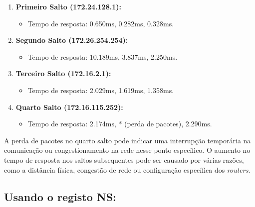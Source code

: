 \begin{enumerate}
    \item \textbf{Primeiro Salto (172.24.128.1):}
        \begin{itemize}
            \item Tempo de resposta: 0.650ms, 0.282ms, 0.328ms.
        \end{itemize}
    
    \item \textbf{Segundo Salto (172.26.254.254):}
        \begin{itemize}
            \item Tempo de resposta: 10.189ms, 3.837ms, 2.250ms.
        \end{itemize}
    
    \item \textbf{Terceiro Salto (172.16.2.1):}
        \begin{itemize}
            \item Tempo de resposta: 2.029ms, 1.619ms, 1.358ms.
        \end{itemize}
    
    \item \textbf{Quarto Salto (172.16.115.252):}
        \begin{itemize}
            \item Tempo de resposta: 2.174ms, * (perda de pacotes), 2.290ms.
        \end{itemize}
  \end{enumerate}
  
  A perda de pacotes no quarto salto pode indicar uma interrupção 
  temporária na comunicação ou congestionamento na rede nesse ponto 
  específico. O aumento no tempo de resposta nos saltos subsequentes 
  pode ser causado por várias razões, como a distância física, 
  congestão de rede ou configuração específica dos \textit{routers}.
  

\subsection{Usando o registo NS:}

